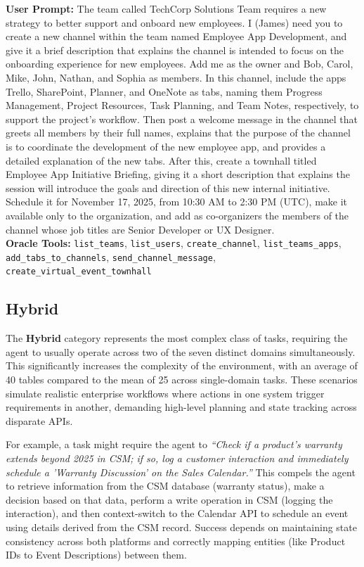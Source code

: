 \begin{taskbox}
\textbf{User Prompt:} The team called TechCorp Solutions Team requires a new strategy to better support and onboard new employees. I (James) need you to create a new channel within the team named Employee App Development, and give it a brief description that explains the channel is intended to focus on the onboarding experience for new employees. Add me as the owner and Bob, Carol, Mike, John, Nathan, and Sophia as members. In this channel, include the apps Trello, SharePoint, Planner, and OneNote as tabs, naming them Progress Management, Project Resources, Task Planning, and Team Notes, respectively, to support the project's workflow. Then post a welcome message in the channel that greets all members by their full names, explains that the purpose of the channel is to coordinate the development of the new employee app, and provides a detailed explanation of the new tabs. After this, create a townhall titled Employee App Initiative Briefing, giving it a short description that explains the session will introduce the goals and direction of this new internal initiative. Schedule it for November 17, 2025, from 10:30 AM to 2:30 PM (UTC), make it available only to the organization, and add as co-organizers the members of the channel whose job titles are Senior Developer or UX Designer.\\

\textbf{Oracle Tools:} \texttt{list\_teams}, \texttt{list\_users}, \texttt{create\_channel}, \texttt{list\_teams\_apps}, \texttt{add\_tabs\_to\_channels}, \texttt{send\_channel\_message}, \texttt{create\_virtual\_event\_townhall}
\end{taskbox}

\subsection{Hybrid}
\label{app:cat_hybrid}

The \textbf{Hybrid} category represents the most complex class of tasks, requiring the agent to usually operate across two of the seven distinct domains simultaneously. This significantly increases the complexity of the environment, with an average of 40 tables compared to the mean of 25 across single-domain tasks. These scenarios simulate realistic enterprise workflows where actions in one system trigger requirements in another, demanding high-level planning and state tracking across disparate APIs.

For example, a task might require the agent to \textit{``Check if a product's warranty extends beyond 2025 in CSM; if so, log a customer interaction and immediately schedule a 'Warranty Discussion' on the Sales Calendar.''} This compels the agent to retrieve information from the CSM database (warranty status), make a decision based on that data, perform a write operation in CSM (logging the interaction), and then context-switch to the Calendar API to schedule an event using details derived from the CSM record. Success depends on maintaining state consistency across both platforms and correctly mapping entities (like Product IDs to Event Descriptions) between them.

